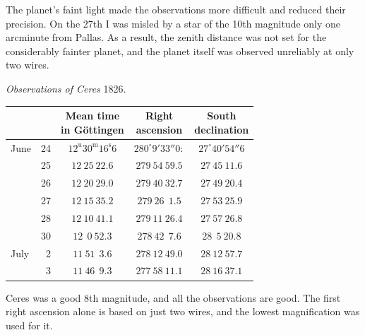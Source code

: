 The planet’s faint light made the observations more difficult and reduced their precision. On the 27th I was misled by a star of the 10th magnitude only one arcminute from Pallas. As a result, the zenith distance was not set for the considerably fainter planet, and the planet itself was observed unreliably at only two wires.


\begin{center}
\emph{Observations of Ceres} 1826.
\end{center}

\begin{center}
\begingroup\small\setlength{\tabcolsep}{4pt}
\begin{tabular}{lr|c|c|c}
 & & \shortstack{Mean time\\in Göttingen} & \shortstack{Right\\ascension} & \shortstack{South\\declination} \\
\hline
June & 24 & $12^{\mathrm u}30^{\mathrm m}16^{\mathrm s}6$ & $280^\circ 9' 33''0:$ & $27^\circ 40' 54''6$ \\
 & 25 & $12\ 25\ 22.6$ & $279\ 54\ 59.5$ & $27\ 45\ 11.6$ \\
 & 26 & $12\ 20\ 29.0$ & $279\ 40\ 32.7$ & $27\ 49\ 20.4$ \\
 & 27 & $12\ 15\ 35.2$ & $279\ 26\ \ 1.5$ & $27\ 53\ 25.9$ \\
 & 28 & $12\ 10\ 41.1$ & $279\ 11\ 26.4$ & $27\ 57\ 26.8$ \\
 & 30 & $12\ \ 0\ 52.3$ & $278\ 42\ \ 7.6$ & $28\ \ 5\ 20.8$ \\
July & \ 2 & $11\ 51\ \ 3.6$ & $278\ 12\ 49.0$ & $28\ 12\ 57.7$ \\
 & \ 3 & $11\ 46\ \ 9.3$ & $277\ 58\ 11.1$ & $28\ 16\ 37.1$ \\
\end{tabular}
\endgroup
\end{center}

Ceres was a good 8th magnitude, and all the observations are good. The first right ascension alone is based on just two wires, and the lowest magnification was used for it.

